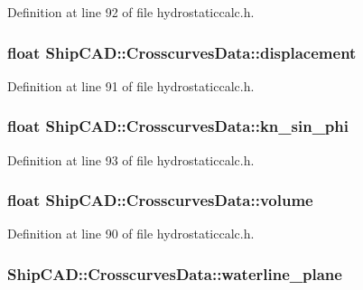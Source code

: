 Definition at line 92 of file hydrostaticcalc.\-h.

\hypertarget{structShipCAD_1_1CrosscurvesData_a9a7baa66159e203888390eaa63caf708}{
\subsubsection[{displacement}]{\setlength{\rightskip}{0pt plus 5cm}float Ship\-C\-A\-D\-::\-Crosscurves\-Data\-::displacement}}\label{structShipCAD_1_1CrosscurvesData_a9a7baa66159e203888390eaa63caf708}


Definition at line 91 of file hydrostaticcalc.\-h.

\hypertarget{structShipCAD_1_1CrosscurvesData_a55150860fed821e314e18b72f1975749}{
\subsubsection[{kn\-\_\-sin\-\_\-phi}]{\setlength{\rightskip}{0pt plus 5cm}float Ship\-C\-A\-D\-::\-Crosscurves\-Data\-::kn\-\_\-sin\-\_\-phi}}\label{structShipCAD_1_1CrosscurvesData_a55150860fed821e314e18b72f1975749}


Definition at line 93 of file hydrostaticcalc.\-h.

\hypertarget{structShipCAD_1_1CrosscurvesData_a9bec38a77bf87ab5feb76899e39e4f7b}{
\subsubsection[{volume}]{\setlength{\rightskip}{0pt plus 5cm}float Ship\-C\-A\-D\-::\-Crosscurves\-Data\-::volume}}\label{structShipCAD_1_1CrosscurvesData_a9bec38a77bf87ab5feb76899e39e4f7b}


Definition at line 90 of file hydrostaticcalc.\-h.

\hypertarget{structShipCAD_1_1CrosscurvesData_a1ea6de1b52289e8392e8d499ae4aad04}{
\subsubsection[{waterline\-\_\-plane}]{ Ship\-C\-A\-D\-::\-Crosscurves\-Data\-::waterline\-\_\-plane}}\label{structShipCAD_1_1CrosscurvesData_a1ea6de1b52289e8392e8d499ae4aad04}


